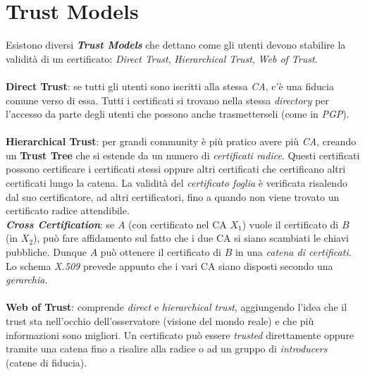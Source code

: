 \documentclass[11pt, a4paper, twoside, italian]{report}
\theoremstyle{plain}
\begin{document}
\section*{Trust Models}
Esistono diversi \textbf{\textit{Trust Models}} che dettano come gli utenti devono stabilire la validità di un certificato: \textit{Direct Trust}, \textit{Hierarchical Trust}, \textit{Web of Trust}.\\
\\
\textbf{Direct Trust}: se tutti gli utenti sono iscritti alla stessa \textit{CA}, c'è una fiducia comune verso di essa. Tutti i certificati si trovano nella stessa \textit{directory} per l'accesso da parte degli utenti che possono anche trasmetterseli (come in \textit{PGP}).\\
\\
\textbf{Hierarchical Trust}: per grandi community è più pratico avere più \textit{CA}, creando un \textbf{Trust Tree} che si estende da un numero di \textit{certificati radice}. Questi certificati possono certificare i certificati stessi oppure altri certificati che certificano altri certificati lungo la catena. La validità del \textit{certificato foglia} è verificata risalendo dal suo certificatore, ad altri certificatori, fino a quando non viene trovato un certificato radice attendibile.\\
\textit{\textbf{Cross Certification}}: se $A$ (con certificato nel CA $X_1$) vuole il certificato di $B$ (in $X_2$), può fare affidamento sul fatto che i due CA si siano scambiati le chiavi pubbliche. Dunque $A$ può ottenere il certificato di $B$ in una \textit{catena di certificati}.\\
Lo schema \textit{X.509} prevede appunto che i vari CA siano disposti secondo una \textit{gerarchia}.\\
\\
\textbf{Web of Trust}: comprende \textit{direct} e \textit{hierarchical trust}, aggiungendo l'idea che il trust sta nell'occhio dell'osservatore (visione del mondo reale) e che più informazioni sono migliori. Un certificato può essere \textit{trusted} direttamente oppure tramite una catena fino a risalire alla radice o ad un gruppo di \textit{introducers} (catene di fiducia).
\end{document}
